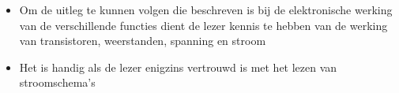\begin{itemize}
\item Om de uitleg te kunnen volgen die beschreven is bij de elektronische werking van de verschillende functies dient de lezer kennis te hebben van de werking van transistoren, weerstanden, spanning en stroom
\item Het is handig als de lezer enigzins vertrouwd is met het lezen van stroomschema's
\end{itemize}
